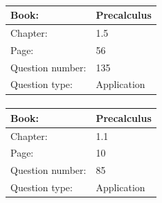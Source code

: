 \documentclass{article}
\begin{document}
            \paragraph{}
            \begin{tabularx}{1\textwidth}{
                    p{}
                    p{}
                }
                \toprule
                Book: & Precalculus
                \\
                \midrule
                Chapter: & 1.5
                \\
                \midrule
                Page: & 56
                \\
                \midrule
                Question number: & 135
                \\
                \midrule
                Question type: & Application
                \\
                \bottomrule
            \end{tabularx}
            
            \paragraph{}
            \begin{tabularx}{1\textwidth}{
                    p{}
                    p{}
                }
                \toprule
                Book: & Precalculus
                \\
                \midrule
                Chapter: & 1.1
                \\
                \midrule
                Page: & 10
                \\
                \midrule
                Question number: & 85
                \\
                \midrule
                Question type: & Application
                \\
                \bottomrule
            \end{tabularx}
            
\end{document}
